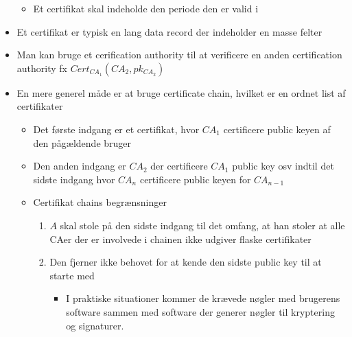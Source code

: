 \documentclass[a4, english]{article}
\begin{document}
\begin{itemize}
\begin{itemize}
    \item Et certifikat skal indeholde den periode den er valid i  
  \end{itemize}
  \item Et certifikat er typisk en lang data record der indeholder en masse felter
  \item Man kan bruge et cerification authority til at verificere en anden certification authority fx $Cert_ {CA_1}(CA_2, pk_{CA_2})$
  \item En mere generel måde er at bruge certificate chain, hvilket er en ordnet list af certifikater   
  \begin{itemize}
    \item Det første indgang er et certifikat, hvor $CA_1$ certificere public keyen af den pågældende bruger
    \item Den anden indgang er $CA_2$ der certificere $CA_1$ public key osv indtil det sidste indgang hvor $CA_n$ certificere public keyen for $CA_{n-1}$ 
    \item Certifikat chains begrænsninger 
    \begin{enumerate}
			\item $A$ skal stole på den sidste indgang til det omfang, at han stoler at alle CAer der er involvede i chainen ikke udgiver flaske certifikater     
			\item Den fjerner ikke behovet for at kende den sidste public key til at starte med 
      \begin{itemize}
      	\item I praktiske situationer kommer de krævede nøgler med brugerens software sammen med software der generer nøgler til kryptering og signaturer.   
      \end{itemize}
    \end{enumerate}  
  \end{itemize}
\end{itemize}
\end{document}
